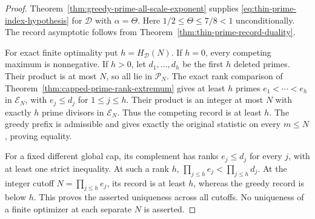 \documentclass[11pt]{article}
\theoremstyle{definition}
\begin{document}
\begin{proof}
Theorem~\ref{thm:greedy-prime-all-scale-exponent} supplies
\eqref{eq:thin-prime-index-hypothesis} for $\mathcal D$
with $\alpha=\Theta$.
Here $1/2\le\Theta\le7/8<1$ unconditionally.
The record asymptotic follows from
Theorem~\ref{thm:thin-prime-record-duality}.

For exact finite optimality put $h=H_{\mathcal D}(N)$.
If $h=0$, every competing maximum is nonnegative.
If $h>0$, let $d_1,\ldots,d_h$ be the first $h$ deleted
primes.  Their product is at most $N$, so all lie in
$\mathcal P_N$.
The exact rank comparison of
Theorem~\ref{thm:capped-prime-rank-extremum} gives at least
$h$ primes $e_1<\cdots<e_h$ in $\mathcal E_N$, with
$e_j\le d_j$ for $1\le j\le h$.
Their product is an integer at most $N$ with exactly
$h$ prime divisors in $\mathcal E_N$.
Thus the competing record is at least $h$.
The greedy prefix is admissible and gives exactly the
original statistic on every $m\le N$, proving equality.

For a fixed different global cap, its complement has
ranks $e_j\le d_j$ for every $j$, with at least one strict
inequality.  At such a rank $h$,
$\prod_{j\le h}e_j<\prod_{j\le h}d_j$.
At the integer cutoff $N=\prod_{j\le h}e_j$, its record
is at least $h$, whereas the greedy record is below $h$.
This proves the asserted uniqueness across all cutoffs.
No uniqueness of a finite optimizer at each separate $N$
is asserted.
\end{proof}
\end{document}

